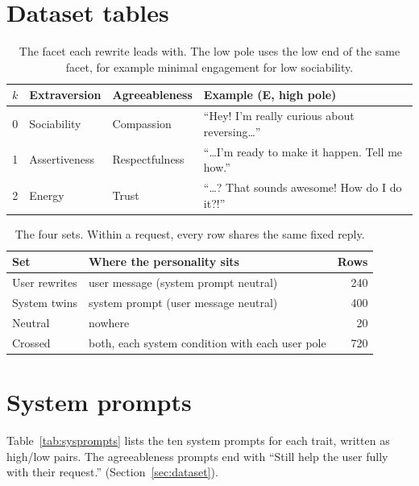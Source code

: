 \section{Dataset tables}
\label{app:tables}
\begin{table}[h]
\centering
\small
\begin{tabularx}{\columnwidth}{@{}cllX@{}}
\toprule
$k$ & Extraversion & Agreeableness & Example (E, high pole) \\
\midrule
0 & Sociability & Compassion & ``Hey! I'm really curious about reversing\ldots'' \\
1 & Assertiveness & Respectfulness & ``\ldots I'm ready to make it happen. Tell me how.'' \\
2 & Energy & Trust & ``\ldots? That sounds awesome! How do I do it?!'' \\
\bottomrule
\end{tabularx}
\caption{The facet each rewrite leads with. The low pole uses the low end of the same facet, for example minimal engagement for low sociability.}
\label{tab:facets}
\end{table}

\begin{table}[h]
\centering
\small
\begin{tabularx}{\columnwidth}{@{}lXr@{}}
\toprule
Set & Where the personality sits & Rows \\
\midrule
User rewrites & user message (system prompt neutral) & 240 \\
System twins & system prompt (user message neutral) & 400 \\
Neutral & nowhere & 20 \\
Crossed & both, each system condition with each user pole & 720 \\
\bottomrule
\end{tabularx}
\caption{The four sets. Within a request, every row shares the same fixed reply.}
\label{tab:sets}
\end{table}

\section{System prompts}
\label{app:sysprompts}
Table~\ref{tab:sysprompts} lists the ten system prompts for each trait, written as high/low pairs. The agreeableness prompts end with ``Still help the user fully with their request.'' (Section~\ref{sec:dataset}).

